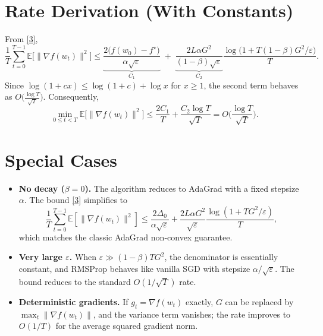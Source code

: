 \documentclass{article}
\newcommand{\E}{\mathbb{E}}
\begin{document}
\section*{Rate Derivation (With Constants)}
From \eqref{3},
\[
\frac{1}{T}\sum_{t=0}^{T-1}\E\!\big[\|\nabla f(w_t)\|^2\big]
\le
\underbrace{\frac{2\big(f(w_0)-f^\star\big)}{\alpha\sqrt{\varepsilon}}}_{C_1}
\;+\;
\underbrace{\frac{2L\alpha G^2}{(1-\beta)\sqrt{\varepsilon}}}_{C_2}
\frac{\log\!\big(1+T(1-\beta)G^2/\varepsilon\big)}{T}.
\]
Since $\log(1+cx)\le \log(1+c)+\log x$ for $x\ge1$, the second term behaves as
$O\!\big(\frac{\log T}{\sqrt{T}}\big)$.  Consequently,
\[
\min_{0\le t<T}\E\!\big[\|\nabla f(w_t)\|^2\big]
\le
\frac{2C_1}{T}
+\frac{C_2\log T}{\sqrt{T}}
=O\!\Big(\frac{\log T}{\sqrt{T}}\Big).
\]

\section*{Special Cases}
\begin{itemize}
\item \textbf{No decay ($\beta=0$).}  The algorithm reduces to AdaGrad with a
fixed stepsize $\alpha$.  The bound \eqref{3} simplifies to
\[
\frac{1}{T}\sum_{t=0}^{T-1}\E[\|\nabla f(w_t)\|^2]
\le \frac{2\Delta_0}{\alpha\sqrt{\varepsilon}}
+ \frac{2L\alpha G^2}{\sqrt{\varepsilon}}\frac{\log(1+TG^2/\varepsilon)}{T},
\]
which matches the classic AdaGrad non‑convex guarantee.

\item \textbf{Very large $\varepsilon$.}  When $\varepsilon\gg (1-\beta)TG^2$,
the denominator is essentially constant, and RMSProp behaves like vanilla
SGD with stepsize $\alpha/\sqrt{\varepsilon}$.  The bound reduces to the
standard $O(1/\sqrt{T})$ rate.

\item \textbf{Deterministic gradients.}  If $g_t=\nabla f(w_t)$ exactly,
$G$ can be replaced by $\max_t\|\nabla f(w_t)\|$, and the variance term
vanishes; the rate improves to $O(1/T)$ for the average squared gradient norm.
\end{itemize}
\end{document}
